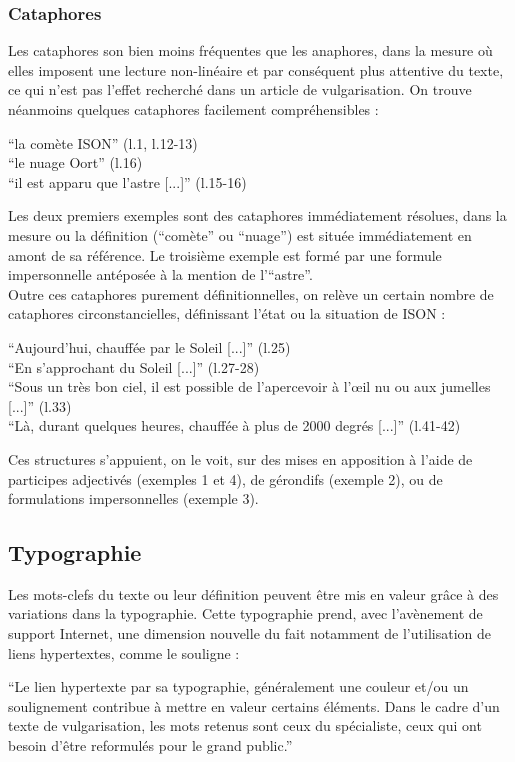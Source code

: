 \documentclass[a4paper,10pt]{article}
\begin{document}
		\subsubsection{Cataphores} \label{cataphore}
			Les cataphores son bien moins fréquentes que les anaphores, dans la mesure où elles imposent une lecture non-linéaire et par conséquent plus attentive du texte, ce qui n'est pas l'effet recherché dans un article de vulgarisation. On trouve néanmoins quelques cataphores facilement compréhensibles :
			\begin{center}
				\footnotesize
				\begin{minipage}{0.7\textwidth}
					``la comète ISON'' (l.1, l.12-13) \\
					``le nuage Oort'' (l.16) \\
					``il est apparu que l'astre [...]'' (l.15-16)
				\end{minipage}
			\end{center}
			Les deux premiers exemples sont des cataphores immédiatement résolues, dans la mesure ou la définition (``comète'' ou ``nuage'') est située immédiatement en amont de sa référence. Le troisième exemple est formé par une formule impersonnelle antéposée à la mention de l'``astre''.\\
			Outre ces cataphores purement définitionnelles, on relève un certain nombre de cataphores circonstancielles, définissant l'état ou la situation de ISON :
			\begin{center}
				\footnotesize
				\begin{minipage}{0.7\textwidth}
					``Aujourd’hui, chauffée par le Soleil [...]'' (l.25)\\
					``En s'approchant du Soleil [...]'' (l.27-28)\\
					``Sous un très bon ciel, il est possible de l'apercevoir à l'œil nu ou aux jumelles [...]'' (l.33)\\
					``Là, durant quelques heures, chauffée à plus de 2000 degrés [...]'' (l.41-42)
				\end{minipage}
			\end{center}
			Ces structures s'appuient, on le voit, sur des mises en apposition à l'aide de participes adjectivés (exemples 1 et 4), de gérondifs (exemple 2), ou de formulations impersonnelles (exemple 3).
	\subsection{Typographie} \label{typo}
		Les mots-clefs du texte ou leur définition peuvent être mis en valeur grâce à des variations dans la typographie. Cette typographie prend, avec l'avènement de support Internet, une dimension nouvelle du fait notamment de l'utilisation de liens hypertextes, comme le souligne \cite{Toure2004} :
		\begin{center}
			\footnotesize
			\begin{minipage}{0.7\textwidth}
				``Le lien hypertexte par sa typographie, généralement une couleur et/ou
				un soulignement contribue à mettre en valeur certains éléments. Dans le cadre d’un texte de vulgarisation, les mots retenus sont ceux du spécialiste, ceux qui ont besoin d’être reformulés pour le grand public.''
			\end{minipage}
		\end{center}
\end{document}
